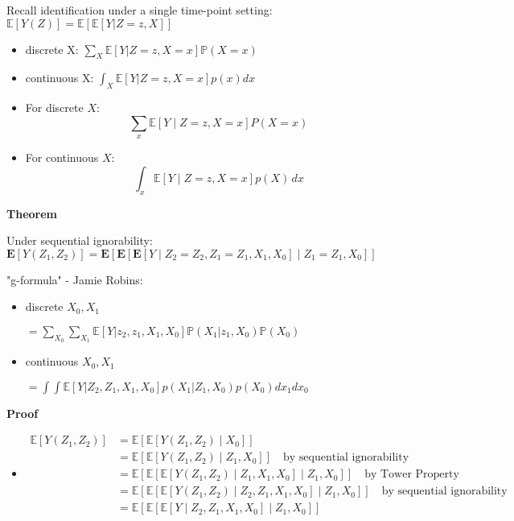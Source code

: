 Recall identification under a single time-point setting:
$\mathbb{E}[Y(Z)] = \mathbb{E}[\mathbb{E}[Y|Z=z,X]]$
\begin{itemize}
    \item discrete X: $\sum_X\mathbb{E}[Y|Z=z,X=x]\mathbb{P}(X=x)$
    \item continuous X: $\int_X\mathbb{E}[Y|Z=z,X=x]p(x)dx$
\end{itemize}
\begin{itemize}
    \item For discrete $X$:
    \[
    \sum_{x} \mathbb{E}[Y \mid Z = z, X = x] P(X = x)
    \]
    \item For continuous $X$:
    \[
    \int_{x} \mathbb{E}[Y \mid Z = z, X = x] p(X) \, dx
    \]
\end{itemize}
\textbf{Theorem}

 Under sequential ignorability:
 $\mathbf{E}[Y(Z_1, Z_2)] = \mathbf{E}\left[\mathbf{E}\left[\mathbf{E}[Y \mid Z_2 = Z_2, Z_1 = Z_1, X_1, X_0] \mid Z_1 = Z_1, X_0\right]\right]$
 
"g-formula" - Jamie Robins:
\begin{itemize}
\item discrete $X_0, X_1$

$=\sum_{X_0}\sum_{X_1}\mathbb{E}[Y|z_2,z_1,X_1,X_0]\mathbb{P}(X_1|z_1,X_0)\mathbb{P}(X_0)$ 
\item continuous $X_0, X_1$

$=\int\int\mathbb{E}[Y|Z_2,Z_1,X_1,X_0]p(X_1|Z_1,X_0)p(X_0)dx_1dx_0$ 
\end{itemize}



\textbf{Proof}
\begin{itemize}
    \item 
\begin{align*}
\mathbb{E}[Y(Z_1,Z_2)] &= \mathbb{E}[\mathbb{E}[Y(Z_1,Z_2) \mid X_0]] \\
&= \mathbb{E}[\mathbb{E}[Y(Z_1,Z_2) \mid Z_1, X_0]] \quad \text{by sequential ignorability} \\
&= \mathbb{E}[\mathbb{E}[\mathbb{E}[Y(Z_1,Z_2) \mid Z_1, X_1, X_0] \mid Z_1, X_0]] \quad \text{by Tower Property} \\
&= \mathbb{E}[\mathbb{E}[\mathbb{E}[Y(Z_1,Z_2) \mid Z_2, Z_1, X_1, X_0] \mid Z_1, X_0]] \quad \text{by sequential ignorability} \\
&= \mathbb{E}[\mathbb{E}[\mathbb{E}[Y \mid Z_2, Z_1, X_1, X_0] \mid Z_1, X_0]]
\end{align*}
\end{itemize}


